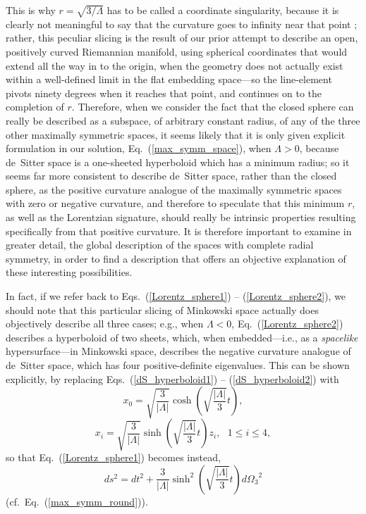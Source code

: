 This is why $r=\sqrt{3/\Lambda}$ has to be called a coordinate singularity, because it is clearly not meaningful to say that the curvature goes to infinity near that point \cite{Schmidt1971}; rather, this peculiar slicing is the result of our prior attempt to describe an open, positively curved Riemannian manifold, using spherical coordinates that would extend all the way in to the origin, when the geometry does not actually exist within a well-defined limit in the flat embedding space---so the line-element pivots ninety degrees when it reaches that point, and continues on to the completion of $r$. Therefore, when we consider the fact that the closed sphere can really be described as a subspace, of arbitrary constant radius, of any of the three other maximally symmetric spaces, it seems likely that it is only given explicit formulation in our solution, Eq.~(\ref{max_symm_space}), when $\Lambda>0$, because de~Sitter space is a one-sheeted hyperboloid which has a minimum radius; so it seems far more consistent to describe de~Sitter space, rather than the closed sphere, as the positive curvature analogue of the maximally symmetric spaces with zero or negative curvature, and therefore to speculate that this minimum $r$, as well as the Lorentzian signature, should really be intrinsic properties resulting specifically from that positive curvature. It is therefore important to examine in greater detail, the global description of the spaces with complete radial symmetry, in order to find a description that offers an objective explanation of these interesting possibilities. 

In fact, if we refer back to Eqs.~(\ref{Lorentz_sphere1}) -- (\ref{Lorentz_sphere2}), we should note that this particular slicing of Minkowski space actually does objectively describe all three cases; e.g., when $\Lambda<0$, Eq.~(\ref{Lorentz_sphere2}) describes a hyperboloid of two sheets, which, when embedded---i.e., as a \textit{spacelike} hypersurface---in Minkowski space, describes the negative curvature analogue of de~Sitter space, which has four positive-definite eigenvalues. This can be shown explicitly, by replacing Eqs.~(\ref{dS_hyperboloid1}) -- (\ref{dS_hyperboloid2}) with
\begin{equation}
x_0=\sqrt{\frac{3}{|\Lambda|}}\cosh\left(\sqrt{\frac{|\Lambda|}{3}}t\right),\label{AdS_hyperboloid1}
\end{equation}
\begin{equation}
x_i=\sqrt{\frac{3}{|\Lambda|}}\sinh\left(\sqrt{\frac{|\Lambda|}{3}}t\right)z_i,~~~1\leq{i}\leq4,\label{AdS_hyperboloid2}
\end{equation}
so that Eq.~(\ref{Lorentz_sphere1}) becomes instead,
\begin{equation}
ds^2=dt^2+\frac{3}{|\Lambda|}\sinh^2\left(\sqrt{\frac{|\Lambda|}{3}}t\right)d{\Omega_3}^2
\end{equation}
(cf.~Eq.~(\ref{max_symm_round})).

